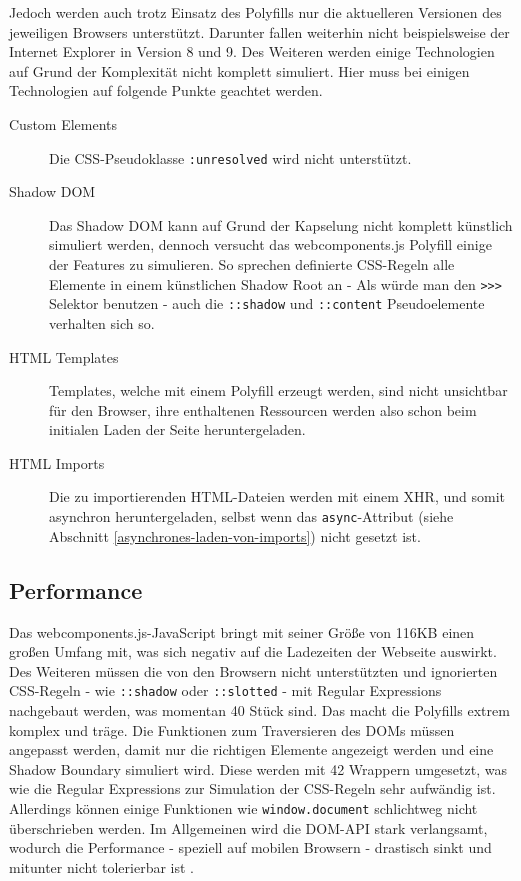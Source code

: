 Jedoch werden auch trotz Einsatz des Polyfills nur die aktuelleren Versionen des jeweiligen Browsers unterstützt. Darunter fallen weiterhin nicht beispielsweise der Internet Explorer in Version 8 und 9. Des Weiteren werden einige Technologien auf Grund der Komplexität nicht komplett simuliert. Hier muss bei einigen Technologien auf folgende Punkte geachtet werden.



\begin{description}
  \item[Custom Elements] Die \ac{CSS}-Pseudoklasse \texttt{:unresolved} wird nicht unterstützt.
  \item[Shadow \ac{DOM}] Das Shadow \ac{DOM} kann auf Grund der Kapselung nicht komplett künstlich simuliert werden, dennoch versucht das webcomponents.js Polyfill einige der Features zu simulieren. So sprechen definierte \ac{CSS}-Regeln alle Elemente in einem künstlichen Shadow Root an - Als würde man den \texttt{\textgreater{}\textgreater{}\textgreater{}} Selektor benutzen - auch die \texttt{::shadow} und \texttt{::content} Pseudoelemente verhalten sich so.
  \item[\ac{HTML} Templates] Templates, welche mit einem Polyfill erzeugt werden, sind nicht unsichtbar für den Browser, ihre enthaltenen Ressourcen werden also schon beim initialen Laden der Seite heruntergeladen.
  \item[\ac{HTML} Imports] Die zu importierenden \ac{HTML}-Dateien werden mit einem \ac{XHR}, und somit asynchron heruntergeladen, selbst wenn das \texttt{async}-Attribut (siehe Abschnitt \ref{asynchrones-laden-von-imports}) nicht gesetzt ist.
\end{description}


\subsection{Performance}\label{performance}

Das webcomponents.js-JavaScript \cite{citeulike:13914238} bringt mit seiner Größe von 116KB einen großen Umfang mit, was sich negativ auf die Ladezeiten der Webseite auswirkt. Des Weiteren müssen die von den Browsern nicht unterstützten und ignorierten \ac{CSS}-Regeln - wie \texttt{::shadow} oder \texttt{::slotted} - mit Regular Expressions nachgebaut werden, was momentan 40 Stück sind. Das macht die Polyfills extrem komplex und träge. Die Funktionen zum Traversieren des \ac{DOM}s müssen angepasst werden, damit nur die richtigen Elemente angezeigt werden und eine Shadow Boundary simuliert wird. Diese werden mit 42 Wrappern umgesetzt, was wie die Regular Expressions zur Simulation der \ac{CSS}-Regeln sehr aufwändig ist. Allerdings können einige Funktionen wie \texttt{window.document} schlichtweg nicht überschrieben werden. Im Allgemeinen wird die \ac{DOM}-\ac{API} stark verlangsamt, wodurch die Performance - speziell auf mobilen Browsern - drastisch sinkt und mitunter nicht tolerierbar ist \cite{citeulike:13886251}.


